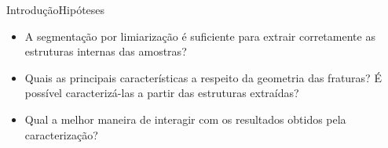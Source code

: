 \documentclass{beamer}
\begin{document}
\begin{frame}{Introdução}{Hipóteses}
    \begin{itemize}
    
    \item A segmentação por limiarização é suficiente para extrair corretamente as estruturas internas das amostras?
    
    \item Quais as principais características a respeito da geometria das fraturas? É possível caracterizá-las a partir das estruturas extraídas?
    
    \item Qual a melhor maneira de interagir com os resultados obtidos pela caracterização?
    
    \end{itemize}
\end{frame}
\end{document}
